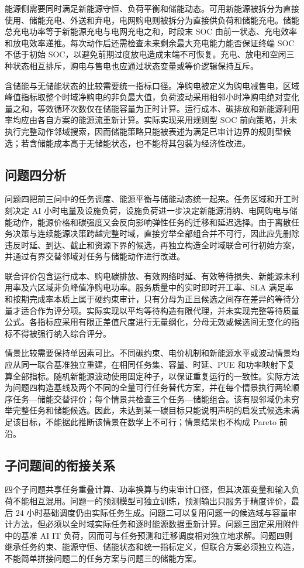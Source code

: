 能源侧需要同时满足新能源守恒、负荷平衡和储能动态。可用新能源被拆分为直接使用、储能充电、外送和弃电，电网购电则被拆分为直接供负荷和储能充电。储能总充电功率等于新能源充电与电网充电之和，时段末 SOC 由前一状态、充电效率和放电效率递推。每次动作后还需检查未来剩余最大充电能力能否保证终端 SOC 不低于初始 SOC，以避免前期过度放电造成末端不可恢复。充电、放电和空闲三种状态相互排斥，购电与售电也应通过状态变量或等价逻辑保持互斥。

含储能与无储能状态的比较需要统一指标口径。净购电被定义为购电减售电，区域峰值指标取整个时域净购电的非负最大值，负荷波动采用相邻小时净购电绝对变化量之和，等效循环次数仅在储能容量为正时计算。运行成本、碳排放和新能源利用率均应由各自方案的能源流重新计算。实际实现采用规则型 SOC 前向策略，并未执行完整动作邻域搜索，因而储能策略只能被表述为满足已审计边界的规则型候选；若含储能成本高于无储能状态，也不能将其包装为经济性改进。

\subsection{问题四分析}

问题四把前三问中的任务调度、能源平衡与储能动态统一起来。任务区域和开工时刻决定 AI 小时电量及设施负荷，设施负荷进一步决定新能源消纳、电网购电与储能动作，能源价格和碳强度又会反向影响弹性任务的迁移和延迟选择。由于离散任务决策与连续能源决策跨越完整时域，直接穷举全部组合并不可行，因此应先删除违反时延、到达、截止和资源下界的候选，再独立构造全时域联合可行初始方案，并通过有界交替邻域对任务与储能动作进行改进。

联合评价包含运行成本、购电碳排放、有效网络时延、有效等待损失、新能源未利用率及六区域非负峰值净购电功率。服务质量中的实时即时开工率、SLA 满足率和按期完成率本质上属于硬约束审计，只有分母为正且候选之间存在差异的等待分量才适合作为评分项。实际实现以平均等待构造有限代理，并未实现完整等待质量公式。各指标应采用有限正差值尺度进行无量纲化，分母无效或候选间无变化的指标不得被强行纳入综合评分。

情景比较需要保持单因素可比。不同碳约束、电价机制和新能源水平或波动情景均应从同一联合基准独立重建，在相同任务集、容量、时延、PUE 和功率映射下复算全部指标。随机新能源波动使用固定种子，以保证重复运行的一致性。实际方法为问题四构造基线及两个不同的全量可行任务替代方案，并在每个情景执行两轮顺序任务—储能交替评价；每个情景共检查三个任务—储能组合。该有限邻域仍未穷举完整任务和储能候选。因此，未达到某一碳目标只能说明声明的启发式候选未满足该目标，不能据此推断该情景在数学上不可行；情景结果也不构成 Pareto 前沿。

\subsection{子问题间的衔接关系}

四个子问题共享任务重叠计算、功率换算与约束审计口径，但其决策变量和输入负荷不能相互混用。问题一的预测模型可独立训练，预测输出只服务于精度评价，最后 $24$ 小时基础调度仍由实际任务生成。问题二可以复用问题一的候选域与容量审计方法，但必须以全时域实际任务和逐时能源数据重新计算。问题三固定采用附件中的基准 AI IT 负荷，因而可与任务预测和迁移调度相对独立地求解。问题四则继承任务约束、能源守恒、储能状态和统一指标定义，但联合方案必须独立构造，不能简单拼接问题二的任务方案与问题三的储能方案。
